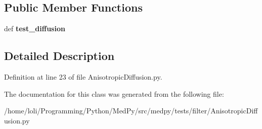\subsection*{Public Member Functions}
\begin{DoxyCompactItemize}
\item 
\hypertarget{classmedpy_1_1tests_1_1filter_1_1AnisotropicDiffusion_1_1TestSurfaceClass_ae82f9cb1e824e5bdfe4447c3a1abb3ae}{
def {\bfseries test\_\-diffusion}}
\label{classmedpy_1_1tests_1_1filter_1_1AnisotropicDiffusion_1_1TestSurfaceClass_ae82f9cb1e824e5bdfe4447c3a1abb3ae}

\end{DoxyCompactItemize}


\subsection{Detailed Description}


Definition at line 23 of file AnisotropicDiffusion.py.



The documentation for this class was generated from the following file:\begin{DoxyCompactItemize}
\item 
/home/loli/Programming/Python/MedPy/src/medpy/tests/filter/AnisotropicDiffusion.py\end{DoxyCompactItemize}
